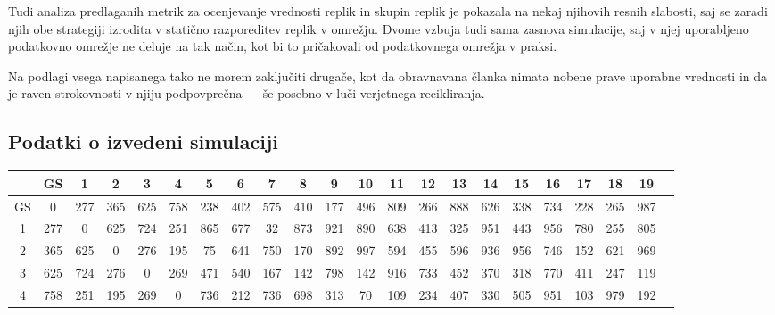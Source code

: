 \documentclass[a4paper, 12pt]{book}
\begin{document}
Tudi analiza predlaganih metrik za ocenjevanje vrednosti replik in skupin
replik je pokazala na nekaj njihovih resnih slabosti, saj se zaradi njih
obe strategiji izrodita v statično razporeditev replik v omrežju. Dvome
vzbuja tudi sama zasnova simulacije, saj v njej uporabljeno podatkovno omrežje
ne deluje na tak način, kot bi to pričakovali od podatkovnega omrežja v
praksi.

Na podlagi vsega napisanega tako ne morem zaključiti drugače, kot da
obravnavana članka nimata nobene prave uporabne vrednosti in da je raven
strokovnosti v njiju podpovprečna --- še posebno v luči verjetnega
recikliranja.



\begin{appendices}
\chapter{Podatki o izvedeni simulaciji}

\begin{table}[h]
\tiny
  \begin{center}
    \begin{tabulary}{1.0\textwidth}{
       | C | C | C | C | C | C | C | C | C | C | C | C | C | C | C | C | C | C | C | C | C | C |
    }
    & GS & 1 & 2 & 3 & 4 & 5 & 6 & 7 & 8 & 9 & 10 & 11 & 12 & 13 & 14 & 15 & 16 & 17 & 18 & 19 \\ \hline

GS & 0 & 277 & 365 & 625 & 758 & 238 & 402 & 575 & 410 & 177 & 496 & 809 & 266 & 888 & 626 & 338 & 734 & 228 & 265 & 987 \\ \hline

1 & 277 & 0 & 625 & 724 & 251 & 865 & 677 & 32 & 873 & 921 & 890 & 638 & 413 & 325 & 951 & 443 & 956 & 780 & 255 & 805 \\ \hline

2 & 365 & 625 & 0 & 276 & 195 & 75 & 641 & 750 & 170 & 892 & 997 & 594 & 455 & 596 & 936 & 956 & 746 & 152 & 621 & 969 \\ \hline

3 & 625 & 724 & 276 & 0 & 269 & 471 & 540 & 167 & 142 & 798 & 142 & 916 & 733 & 452 & 370 & 318 & 770 & 411 & 247 & 119 \\ \hline

4 & 758 & 251 & 195 & 269 & 0 & 736 & 212 & 736 & 698 & 313 & 70 & 109 & 234 & 407 & 330 & 505 & 951 & 103 & 979 & 192 \\ \hline


\end{tabulary}
\end{center}
\end{table}
\end{appendices}
\end{document}
